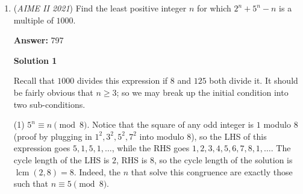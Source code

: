 \begin{enumerate}
 Let the point $B'$ be symmetric to $B$ with respect to the perpendicular bisector $AC.$ Then the quadrilateral $AB'CD$ is an inscribed one, $AB' = b, B'C = a.$

 \[2 \angle AEB = \overset{\Large\frown} {AB}  + \overset{\Large\frown} {CD}.\]
 \begin{align*} 2\angle B'AD = \overset{\Large\frown} {B'C} + \overset{\Large\frown} {CD} = \overset{\Large\frown} {AB} + \overset{\Large\frown} {CD} \implies \angle AEB = \angle B'AD.\end{align*}


 We apply the Law of Cosines to $\triangle AB'D$ and $\triangle CB'D$:
 \begin{align*} B'D^2 = AD^2 + AB'^2 – 2 AD \cdot AB' \cos \theta, \end{align*}

 \begin{align*} B'D^2 = CD^2 + CB'^2 + 2 CD \cdot CB' \cos \theta,\end{align*}

 \begin{align*} d^2 + b^2 – 2 bd \cos \theta = c^2 + a^2 + 2ac \cos \theta,\end{align*}

 \begin{align*} 2(ac + bd) \cos \theta = |d^2 – c^2 + b^2 – a^2|.\end{align*}


 \textbf{vladimir.shelomovskii@gmail.com, vvsss}

 \textbf{Note 1} By generalization, the tangent of the acute angle formed by the diagonals is 
 \[\left|\frac{4A}{a^2-b^2+c^2-d^2}\right|.\]



	\item (\textit{AIME II 2021}) Find the least positive integer $n$ for which $2^n + 5^n - n$ is a multiple of $1000$.


 
 \textbf{Answer: }797



\textbf{Solution 1}

Recall that $1000$ divides this expression if $8$ and $125$ both divide it. It should be fairly obvious that $n \geq 3$; so we may break up the initial condition into two sub-conditions.

 (1) $5^n \equiv n \pmod{8}$. Notice that the square of any odd integer is $1$ modulo $8$ (proof by plugging in $1^2,3^2,5^2,7^2$ into modulo $8$), so the LHS of this expression goes $5,1,5,1,\ldots$, while the RHS goes $1,2,3,4,5,6,7,8,1,\ldots$. The cycle length of the LHS is $2$, RHS is $8$, so the cycle length of the solution is $\operatorname{lcm}(2,8)=8$. Indeed, the $n$ that solve this congruence are exactly those such that $n \equiv 5 \pmod{8}$.


\end{enumerate}
